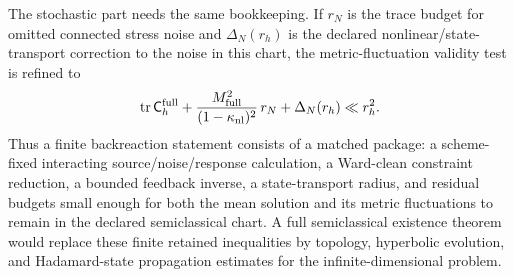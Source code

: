 \begin{controlledapproximation}
The stochastic part needs the same bookkeeping.  If \(r_N\) is the trace
budget for omitted connected stress noise and \(\Delta_N(r_h)\) is the
declared nonlinear/state-transport correction to the noise in this chart, the
metric-fluctuation validity test is refined to
\begin{equation}
  \operatorname{tr}\mathsf C_h^{\rm full}
  +
  \frac{M_{\rm full}^2}{(1-\kappa_{\rm nl})^2}\,r_N
  +
  \Delta_N(r_h)
  \ll r_h^2 .
  \label{eq:semiclassical-nonlinear-noise-validity}
\end{equation}
Thus a finite backreaction statement consists of a matched package: a
scheme-fixed interacting source/noise/response calculation, a Ward-clean
constraint reduction, a bounded feedback inverse, a state-transport radius,
and residual budgets small enough for both the mean solution and its metric
fluctuations to remain in the declared semiclassical chart.  A full
semiclassical existence theorem would replace these finite retained
inequalities by topology, hyperbolic evolution, and Hadamard-state
propagation estimates for the infinite-dimensional problem.
\end{controlledapproximation}

